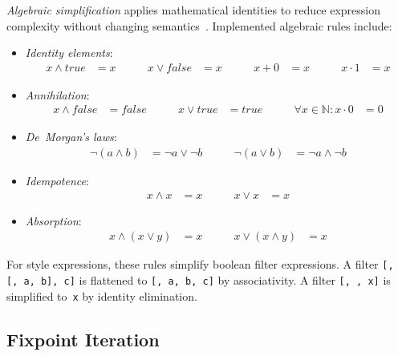 \emph{Algebraic simplification} applies mathematical identities to reduce expression complexity without changing semantics~\cite{ahoCompilersPrinciplesTechniques2007}.
Implemented algebraic rules include:

\begin{itemize}
	\item \emph{Identity elements}:
	\[
	\begin{alignedat}{4}
		x \land \mathit{true}   & = x \qquad &
		x \lor \mathit{false}   & = x \qquad &
		x + 0                   & = x \qquad &
		x \cdot 1               & = x
	\end{alignedat}
	\]

	\item \emph{Annihilation}:
	\[
	\begin{alignedat}{3}
		x \land \mathit{false}  & = \mathit{false} \qquad &
		x \lor \mathit{true}    & = \mathit{true} \qquad &
		\forall x \in \mathbb{N}: x \cdot 0               & = 0
	\end{alignedat}
	\]

	\item \emph{De~Morgan's laws}:
	\[
	\begin{alignedat}{2}
		\lnot (a \land b) & = \lnot a \lor \lnot b \qquad &
		\lnot (a \lor b)  & = \lnot a \land \lnot b
	\end{alignedat}
	\]

	\item \emph{Idempotence}:
	\[
	\begin{alignedat}{2}
		x \land x & = x \qquad &
		x \lor x  & = x
	\end{alignedat}
	\]

	\item \emph{Absorption}:
	\[
	\begin{alignedat}{2}
		x \land (x \lor y) & = x \qquad &
		x \lor (x \land y) & = x
	\end{alignedat}
	\]
\end{itemize}

\noindent For style expressions, these rules simplify boolean filter expressions.
A filter \texttt{[, [, a, b], c]} is flattened to \texttt{[, a, b, c]} by associativity.
A filter \texttt{[, , x]} is simplified to~\texttt{x} by identity elimination.

\subsection{Fixpoint Iteration}\label{sub:fixpoint}

